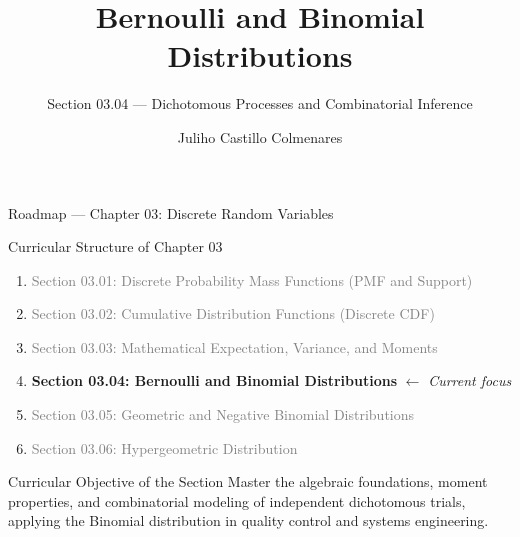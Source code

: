 \documentclass[aspectratio=169,xcolor={dvipsnames,table}]{beamer}
\title{Bernoulli and Binomial Distributions}
\subtitle{Section 03.04 --- Dichotomous Processes and Combinatorial Inference}
\author[J. Castillo Colmenares]{Juliho Castillo Colmenares}
\institute[Tec de Monterrey]{Tecnológico de Monterrey}
\date{\vspace{-1.2cm}}
\begin{document}
\begin{frame}[plain]
	\titlepage
\end{frame}

\begin{frame}{Roadmap --- Chapter 03: Discrete Random Variables}
	\begin{block}{Curricular Structure of Chapter 03}
		\small
		\begin{enumerate}
			\itemsep=0.04cm
			\item \textcolor{gray}{Section 03.01: Discrete Probability Mass Functions (PMF and Support)}
			\item \textcolor{gray}{Section 03.02: Cumulative Distribution Functions (Discrete CDF)}
			\item \textcolor{gray}{Section 03.03: Mathematical Expectation, Variance, and Moments}
			\item \textbf{\textcolor{TecRojo}{Section 03.04: Bernoulli and Binomial Distributions}} $\leftarrow$ \emph{Current focus}
			\item \textcolor{gray}{Section 03.05: Geometric and Negative Binomial Distributions}
			\item \textcolor{gray}{Section 03.06: Hypergeometric Distribution}
		\end{enumerate}
	\end{block}
	\vspace{-0.15cm}
	\begin{alertblock}{Curricular Objective of the Section}
		\footnotesize
		Master the algebraic foundations, moment properties, and combinatorial modeling of independent dichotomous trials, applying the Binomial distribution in quality control and systems engineering.
	\end{alertblock}
\end{frame}
\end{document}
